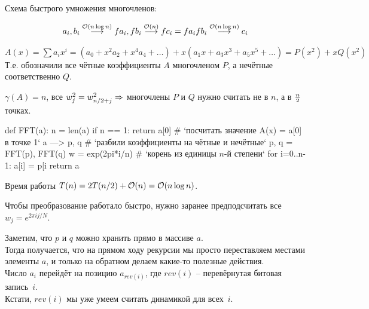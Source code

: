 

Схема быстрого умножения многочленов: 

\begin{smallformula}
$$a_i, b_i \overset{\mathcal{O}(n \log n)}{\longrightarrow} fa_i, fb_i \overset{\mathcal{O}(n)}{\longrightarrow} fc_i = fa_ifb_i \overset{\mathcal{O}(n \log n)}{\longrightarrow} c_i$$
\end{smallformula}



\up
{}

$A(x) = \sum a_i x^i = (a_0 + x^2a_2 + x^4a_4 + \dots) + x(a_1x + a_3x^3 + a_5x^5 + \dots) = P(x^2) + xQ(x^2)$\\
Т.е. обозначили все чётные коэффициенты $A$ многочленом $P$, а нечётные соответственно $Q$.

\down
$\gamma(A) = n$, все $w_j^2 = w_{n/2+j}^2 \Rightarrow$ многочлены $P$ и $Q$ нужно считать не в $n$, а в ${\textstyle\frac{n}{2}}$ точках.

\down
\begin{codep}
def FFT(a): 
  n = len(a)
  if n == 1: return a[0] # `посчитать значение A(x) = a[0] в точке 1`
  a ---> p, q # `разбили коэффициенты на чётные и нечётные`
  p, q = FFT(p), FFT(q) 
  w = exp(2pi*i/n) # `корень из единицы $n$-й степени`
  for i=0..n-1: a[i] = p[i%
  return a
\end{codep}

Время работы $T(n) = 2T(n/2) + \mathcal{O}(n) = \mathcal{O}(n \log n)$.


Чтобы преобразование работало быстро, нужно заранее предподсчитать все $w_j = e^{2\pi i j / N}$.

Заметим, что $p$ и $q$ можно хранить прямо в массиве $a$.\\
Тогда получается, что на прямом ходу рекурсии мы просто переставляем местами элементы $a$, и только на обратном делаем какие-то полезные действия.\\
Число $a_i$ перейдёт на позицию $a_{rev(i)}$, где $rev(i)$ -- перевёрнутая битовая запись~$i$. \\
Кстати, $rev(i)$ мы уже умеем считать динамикой для всех~$i$.

